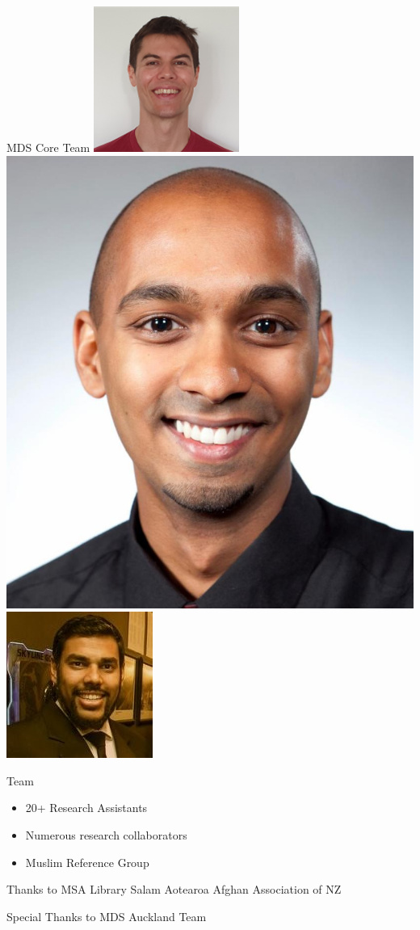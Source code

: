 \documentclass[
  ignorenonframetext,
  aspectratio=169,
]{beamer}
\providecommand{\tightlist}{%
  \setlength{\itemsep}{0pt}\setlength{\parskip}{0pt}}\usepackage{longtable,booktabs,array}
\begin{document}
\begin{frame}{MDS Core Team}
\includegraphics{figs/chris-s.png} \includegraphics{figs/kumar-y.jpg}
\includegraphics{figs/aarif-r.jpeg}
\end{frame}

\begin{frame}{Team}
\label{team}
\begin{itemize}
\tightlist
\item
  20+ Research Assistants
\item
  Numerous research collaborators
\item
  Muslim Reference Group
\end{itemize}
\end{frame}

\begin{frame}{Thanks to}
\label{thanks-to}
MSA Library Salam Aotearoa Afghan Association of NZ
\end{frame}

\begin{frame}{Special Thanks to MDS Auckland Team}
\label{special-thanks-to-mds-auckland-team}
\end{frame}
\end{document}
